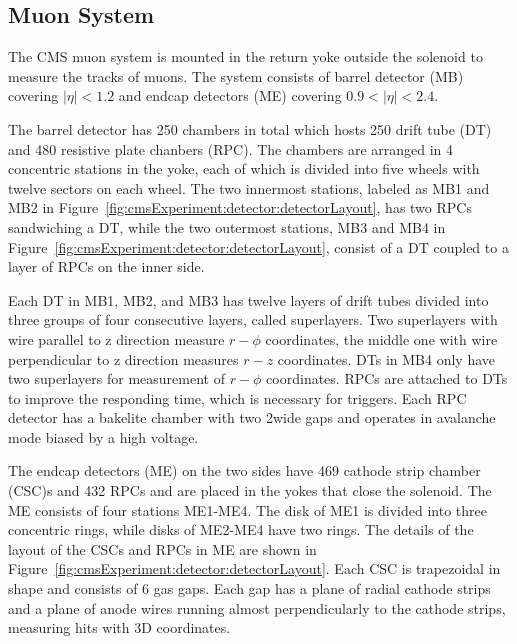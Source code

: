 \subsection{Muon System}
\label{sec:cmsExperiment:detector:muon}
The CMS muon system \cite{cms:muonChamberTdr:CMS:1997iti} is mounted in the return yoke outside the solenoid to measure the tracks of muons. The system consists of barrel detector (MB) covering $|\eta|<1.2$ and endcap detectors (ME) covering $0.9 < |\eta| < 2.4$. 

The barrel detector has 250 chambers in total which hosts 250 drift tube (DT) and 480 resistive plate chanbers (RPC). The chambers are arranged in 4 concentric stations in the yoke, each of which is divided into five wheels with twelve sectors on each wheel. The two innermost stations, labeled as MB1 and MB2 in Figure~\ref{fig:cmsExperiment:detector:detectorLayout}, has two RPCs sandwiching a DT, while the two outermost stations, MB3 and MB4 in Figure~\ref{fig:cmsExperiment:detector:detectorLayout}, consist of a DT coupled to a layer of RPCs on the inner side. 

Each DT in MB1, MB2, and MB3 has twelve layers of drift tubes divided into three groups of four consecutive layers, called superlayers. Two superlayers with wire parallel to z direction measure $r-\phi$ coordinates, the middle one with wire perpendicular to z direction measures $r-z$ coordinates. DTs in MB4 only have two superlayers for measurement of $r-\phi$ coordinates. RPCs are attached to DTs to improve the responding time, which is necessary for triggers. Each RPC detector has a bakelite chamber with two 2\mm wide gaps and operates in avalanche mode biased by a high voltage. 

The endcap detectors (ME) on the two sides have 469 cathode strip chamber (CSC)s and 432 RPCs and are placed in the yokes that close the solenoid. The ME consists of four stations ME1-ME4. The disk of ME1 is divided into three concentric rings, while disks of ME2-ME4 have two rings. The details of the layout of the CSCs and RPCs in ME are shown in Figure~\ref{fig:cmsExperiment:detector:detectorLayout}. Each CSC is trapezoidal in shape and consists of 6 gas gaps. Each gap has a plane of radial cathode strips and a plane of anode wires running almost perpendicularly to the cathode strips, measuring hits with 3D coordinates.

